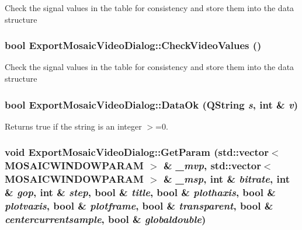 Check the signal values in the table for consistency and store them into the data structure \hypertarget{class_export_mosaic_video_dialog_b044f2f53678532e2c048bb697957432}{
\subsubsection[{CheckVideoValues}]{\setlength{\rightskip}{0pt plus 5cm}bool ExportMosaicVideoDialog::CheckVideoValues ()}}
\label{class_export_mosaic_video_dialog_b044f2f53678532e2c048bb697957432}


Check the signal values in the table for consistency and store them into the data structure \hypertarget{class_export_mosaic_video_dialog_42a99b47c067271c55a492651a1607e9}{
\subsubsection[{DataOk}]{\setlength{\rightskip}{0pt plus 5cm}bool ExportMosaicVideoDialog::DataOk (QString {\em s}, \/  int \& {\em v})}}
\label{class_export_mosaic_video_dialog_42a99b47c067271c55a492651a1607e9}


Returns true if the string is an integer $>$=0. \hypertarget{class_export_mosaic_video_dialog_1734cda9e540bf140c1d3b1db5ecb67b}{
\subsubsection[{GetParam}]{\setlength{\rightskip}{0pt plus 5cm}void ExportMosaicVideoDialog::GetParam (std::vector$<$ {\bf MOSAICWINDOWPARAM} $>$ \& {\em \_\-mvp}, \/  std::vector$<$ {\bf MOSAICWINDOWPARAM} $>$ \& {\em \_\-msp}, \/  int \& {\em bitrate}, \/  int \& {\em gop}, \/  int \& {\em step}, \/  bool \& {\em title}, \/  bool \& {\em plothaxis}, \/  bool \& {\em plotvaxis}, \/  bool \& {\em plotframe}, \/  bool \& {\em transparent}, \/  bool \& {\em centercurrentsample}, \/  bool \& {\em globaldouble})}}
\label{class_export_mosaic_video_dialog_1734cda9e540bf140c1d3b1db5ecb67b}


